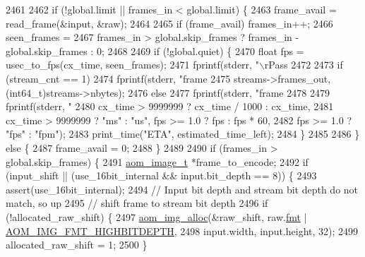 \begin{DoxyCodeInclude}
{{{{{{{{{{{{{{{{{{{{{{{{{{{{{{{{{{{{{{{{{{{{{{{{{{{{{{{2461 
2462       \textcolor{keywordflow}{if} (!global.limit || frames\_in < global.limit) \{
2463         frame\_avail = read\_frame(&input, &raw);
2464 
2465         \textcolor{keywordflow}{if} (frame\_avail) frames\_in++;
2466         seen\_frames =
2467             frames\_in > global.skip\_frames ? frames\_in - global.skip\_frames : 0;
2468 
2469         \textcolor{keywordflow}{if} (!global.quiet) \{
2470           \textcolor{keywordtype}{float} fps = usec\_to\_fps(cx\_time, seen\_frames);
2471           fprintf(stderr, \textcolor{stringliteral}{"\(\backslash\)rPass %
2472 
2473           \textcolor{keywordflow}{if} (stream\_cnt == 1)
2474             fprintf(stderr, \textcolor{stringliteral}{"frame %
2475                     streams->frames\_out, (int64\_t)streams->nbytes);
2476           \textcolor{keywordflow}{else}
2477             fprintf(stderr, \textcolor{stringliteral}{"frame %
2478 
2479           fprintf(stderr, \textcolor{stringliteral}{"%
2480                   cx\_time > 9999999 ? cx\_time / 1000 : cx\_time,
2481                   cx\_time > 9999999 ? \textcolor{stringliteral}{"ms"} : \textcolor{stringliteral}{"us"}, fps >= 1.0 ? fps : fps * 60,
2482                   fps >= 1.0 ? \textcolor{stringliteral}{"fps"} : \textcolor{stringliteral}{"fpm"});
2483           print\_time(\textcolor{stringliteral}{"ETA"}, estimated\_time\_left);
2484         \}
2485 
2486       \} \textcolor{keywordflow}{else} \{
2487         frame\_avail = 0;
2488       \}
2489 
2490       \textcolor{keywordflow}{if} (frames\_in > global.skip\_frames) \{
2491         \hyperlink{structaom__image}{aom\_image\_t} *frame\_to\_encode;
2492         \textcolor{keywordflow}{if} (input\_shift || (use\_16bit\_internal && input.bit\_depth == 8)) \{
2493           assert(use\_16bit\_internal);
2494           \textcolor{comment}{// Input bit depth and stream bit depth do not match, so up}
2495           \textcolor{comment}{// shift frame to stream bit depth}
2496           \textcolor{keywordflow}{if} (!allocated\_raw\_shift) \{
2497             \hyperlink{aom__image_8h_a570db29fbd122951235a08fe9375f6bb}{aom\_img\_alloc}(&raw\_shift, raw.\hyperlink{structaom__image_a6c64b1ab918d80d52eb8f5d6d957e825}{fmt} | 
      \hyperlink{aom__image_8h_a607b37d91f75442f54223ecd85f1b6cb}{AOM\_IMG\_FMT\_HIGHBITDEPTH},
2498                           input.width, input.height, 32);
2499             allocated\_raw\_shift = 1;
2500           \}
}}}}}}}}}}}}}}}}}}}}}}}}}}}}}}}}}}}}}}}}}}}}}}}}}}}}}}}}}}}
\end{DoxyCodeInclude}
